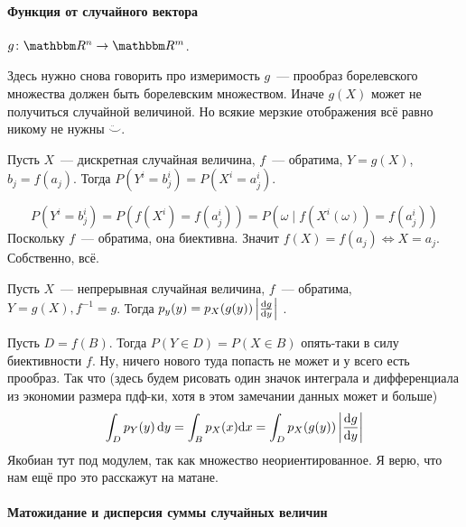 \documentclass[12pt,timbord]{../../../notes}
\begin{document}
\paragraph{Функция от случайного вектора}
\label{par:stat::funcrand}

\begin{defn}\label{defn:stat::funcrand::funcrand}
  $g \colon \R^n \to \R^m$. 
  \begin{itaux}
    Здесь нужно снова говорить про измеримость $g$~--- прообраз борелевского множества должен
    быть борелевским множеством. Иначе $g(X)$ может не получиться случайной величиной. Но всякие
    мерзкие отображения всё равно никому не нужны $\ddot\smile$.
  \end{itaux}
\end{defn}

\begin{prop}\label{prop:stat::funcrand::disc}
  Пусть $X$~--- дискретная случайная величина, $f$~--- обратима, $Y=g(X)$, $b_j= f(a_j)$.
  Тогда $P(Y^i=b^i_j) =P(X^i=a^i_j)$.
\end{prop}
\begin{itlproof}
  \[
  P(Y^i=b^i_j) = P(f(X^i)= f(a^i_j)) = P({\omega \mid f(X^i(\omega))=f(a^i_j)}) 
  \]
  Поскольку $f$~--- обратима, она биективна. Значит $f(X) = f(a_j) \Leftrightarrow X = a_j$.
  Собственно, всё.
\end{itlproof}
\begin{prop}\label{prop:stat::funcrand::cont}
  Пусть $X$~--- непрерывная случайная величина, $f$~--- обратима, $Y=g(X), f^{-1} = g$.
  Тогда $p_y(y) = p_X(g(y)) \left| \frac{\mathrm{d} g}{\mathrm{d} y} \right|$ .
\end{prop}
\begin{itlproof}
  Пусть $D=f(B)$. Тогда $P(Y \in D) = P(X \in B)$ опять-таки в силу биективности $f$. Ну, ничего
  нового туда попасть не может и у всего есть  прообраз. Так что (здесь будем рисовать один значок
  интеграла и дифференциала из экономии размера пдф-ки, хотя в этом замечании данных может и больше)
  \begin{align*}
    \int_D p_Y(y) \, \mathrm{d} y  = \int_B  p_X(x) \mathrm{d} x 
    = \int_D  p_X(g(y)) \left| \frac{\mathrm{d} g}{\mathrm{d} y} \right|  
  \end{align*}
  Якобиан тут под модулем, так как множество неориентированное. Я верю, что нам ещё про это
  расскажут на матане.
\end{itlproof}

\paragraph{Матожидание и дисперсия суммы случайных величин}
\label{par:stat::randsum}
\end{document}

